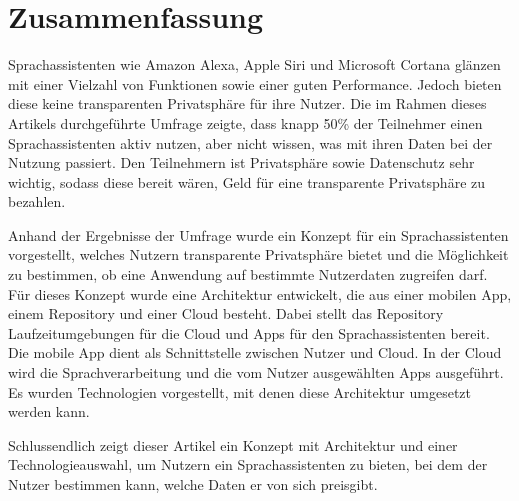 \section{Zusammenfassung}
Sprachassistenten wie Amazon Alexa, Apple Siri und Microsoft Cortana glänzen mit einer Vielzahl von Funktionen sowie einer guten Performance. Jedoch bieten diese keine transparenten Privatsphäre für ihre Nutzer. Die im Rahmen dieses Artikels durchgeführte Umfrage zeigte, dass knapp 50\% der Teilnehmer einen Sprachassistenten aktiv nutzen, aber nicht wissen, was mit ihren Daten bei der Nutzung passiert. Den Teilnehmern ist Privatsphäre sowie Datenschutz sehr wichtig, sodass diese bereit wären, Geld für eine transparente Privatsphäre zu bezahlen. 

Anhand der Ergebnisse der Umfrage wurde ein Konzept für ein Sprachassistenten vorgestellt, welches Nutzern transparente Privatsphäre bietet und die Möglichkeit zu bestimmen, ob eine Anwendung auf bestimmte Nutzerdaten zugreifen darf. Für dieses Konzept wurde eine Architektur entwickelt, die aus einer mobilen App, einem Repository und einer Cloud besteht. Dabei stellt das Repository Laufzeitumgebungen für die Cloud und Apps für den Sprachassistenten bereit. Die mobile App dient als Schnittstelle zwischen Nutzer und Cloud. In der Cloud wird die Sprachverarbeitung und die vom Nutzer ausgewählten Apps ausgeführt. Es wurden Technologien vorgestellt, mit denen diese Architektur umgesetzt werden kann. 

Schlussendlich zeigt dieser Artikel ein Konzept mit Architektur und einer Technologieauswahl, um Nutzern ein Sprachassistenten zu bieten, bei dem der Nutzer bestimmen kann, welche Daten er von sich preisgibt. 



 